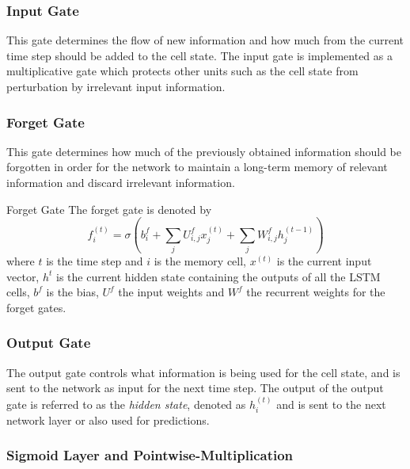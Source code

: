             \subsubsection{Input Gate} 
            
                This gate determines the flow of new information and how much from the current time step should be added to the cell state. The input gate is implemented as a multiplicative gate which protects other units such as the cell state from perturbation by irrelevant input information.

            \subsubsection{Forget Gate}

                This gate determines how much of the previously obtained information should be forgotten in order for the network to maintain a long-term memory of relevant information and discard irrelevant information.
                \begin{pabox}{Forget Gate}
                    \label{def:lstm-forget-gate-definition}
                    The forget gate is denoted by $$f_i^{(t)} = \sigma \left(b_i^f + \sum_{j} U_{i, j}^f x_j^{(t)} + \sum_{j} W_{i, j}^f h_j^{(t - 1)}\right)$$ where $t$ is the time step and $i$ is the memory cell, $x^{(t)}$ is the current input vector, $h^{t}$ is the current hidden state containing the outputs of all the LSTM cells, $b^f$ is the bias, $U^f$ the input weights and $W^f$ the recurrent weights for the forget gates.
                \end{pabox}
                

                

            \subsubsection{Output Gate}

                The output gate controls what information is being used for the cell state, and is sent to the network as input for the next time step. The output of the output gate is referred to as the \emph{hidden state}, denoted as $h_i^{(t)}$ and is sent to the next network layer or also used for predictions.



            \subsubsection{Sigmoid Layer and Pointwise-Multiplication}
            \label{sec:sigmoid-layer-and-pointwise-multiplication}


